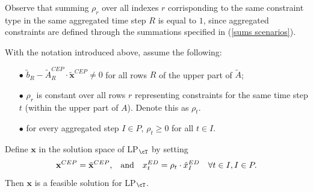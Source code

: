\documentclass[smallextended,natbib]{svjour3}       %
\numberwithin{definition}{section}
\numberwithin{theorem}{section}
\numberwithin{proposition}{section}
\begin{document}
Observe that summing $\rho_r$ over all indexes $r$ corrisponding to the same constraint type in the same aggregated time step $R$ is equal to $1$, since aggregated constraints are defined through the summations specified in (\ref{sums scenarios}).


\begin{proposition}\label{prop rho}
  With the notation introduced above, assume the following:
  \begin{itemize}
  \item[$\bullet$]  $\tilde{b}_R-\tilde{A}_R^{CEP}\cdot\tilde{\mathbf{x}}^{CEP}\neq0$ for all rows $R$ of the upper part of $\tilde{A}$;
  \item[$\bullet$] $\rho_r$ is constant over %
  all rows $r$ representing constraints for the same time step $t$ (within the upper part of $A$). Denote this as $\rho_t$.
  \item[$\bullet$] for every aggregated step $I\in P$,  $\rho_t\ge0$ for all $t\in I$. 
  \end{itemize}
  Define $\mathbf{x}$ in the solution space of LP$_{\cT}$ by setting 
  \[ \mathbf{x}^{CEP} = \tilde{\mathbf{x}}^{CEP}\text{,\quad and\quad} x^{ED}_t = \rho_t\cdot \tilde{x}^{ED}_I \quad \forall t\in I, I\in P.\]
  Then $\mathbf{x}$ is a feasible solution for LP$_{\cT}$.
\end{proposition}
\end{document}

